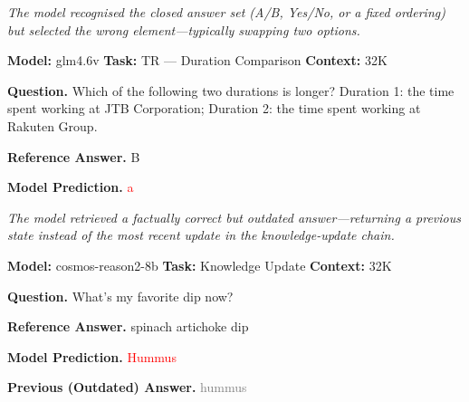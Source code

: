 \documentclass{article}
\begin{document}
\begin{tcolorbox}[
  title={Case Study: Closed-Set Selection Error},
  enhanced, sharp corners,
  colback=gray!3, colframe=black!40,
  boxrule=0.4pt, fonttitle=\bfseries,
  left=4pt, right=4pt, top=3pt, bottom=3pt
]
\footnotesize

\textit{The model recognised the closed answer set (A/B, Yes/No, or a fixed ordering) but selected the wrong element---typically swapping two options.}
\vspace{0.4em}

\textbf{Model:} glm4.6v \hfill \textbf{Task:} TR --- Duration Comparison \hfill \textbf{Context:} 32K
\vspace{0.3em}

\textbf{Question.} Which of the following two durations is longer? Duration 1: the time spent working at JTB Corporation; Duration 2: the time spent working at Rakuten Group.
\vspace{0.3em}

\textbf{Reference Answer.} B

\textbf{Model Prediction.} \textcolor{red}{a}

\end{tcolorbox}

\begin{tcolorbox}[
  title={Case Study: Stale Retrieval},
  enhanced, sharp corners,
  colback=gray!3, colframe=black!40,
  boxrule=0.4pt, fonttitle=\bfseries,
  left=4pt, right=4pt, top=3pt, bottom=3pt
]
\footnotesize

\textit{The model retrieved a factually correct but \emph{outdated} answer---returning a previous state instead of the most recent update in the knowledge-update chain.}
\vspace{0.4em}

\textbf{Model:} cosmos-reason2-8b \hfill \textbf{Task:} Knowledge Update \hfill \textbf{Context:} 32K
\vspace{0.3em}

\textbf{Question.} What's my favorite dip now?
\vspace{0.3em}

\textbf{Reference Answer.} spinach artichoke dip

\textbf{Model Prediction.} \textcolor{red}{Hummus}

\textbf{Previous (Outdated) Answer.} \textcolor{gray}{hummus}

\end{tcolorbox}
\end{document}
